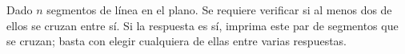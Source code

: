 Dado $n$ segmentos de línea en el plano. Se requiere verificar si al menos dos de ellos se cruzan entre sí. Si la respuesta es sí, imprima este par de segmentos que se cruzan; basta con elegir cualquiera de ellas entre varias respuestas.
